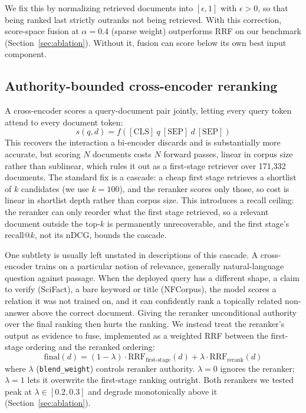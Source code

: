 \documentclass[11pt]{article}
\begin{document}
We fix this by normalizing retrieved documents into $[\epsilon, 1]$ with $\epsilon > 0$, so that being ranked last strictly outranks not being retrieved. With this correction, score-space fusion at $\alpha=0.4$ (sparse weight) outperforms RRF on our benchmark (Section~\ref{sec:ablation}). Without it, fusion can score below its own best input component.

\subsection{Authority-bounded cross-encoder reranking}
\label{sec:rerank-method}

A cross-encoder scores a query-document pair jointly, letting every query token attend to every document token:
\begin{equation}
s(q,d) = f([\text{CLS}]\ q\ [\text{SEP}]\ d\ [\text{SEP}])
\end{equation}
This recovers the interaction a bi-encoder discards and is substantially more accurate, but scoring $N$ documents costs $N$ forward passes, linear in corpus size rather than sublinear, which rules it out as a first-stage retriever over 171{,}332 documents. The standard fix is a cascade: a cheap first stage retrieves a shortlist of $k$ candidates (we use $k=100$), and the reranker scores only those, so cost is linear in shortlist depth rather than corpus size. This introduces a recall ceiling: the reranker can only reorder what the first stage retrieved, so a relevant document outside the top-$k$ is permanently unrecoverable, and the first stage's recall@$k$, not its nDCG, bounds the cascade.

One subtlety is usually left unstated in descriptions of this cascade. A cross-encoder trains on a particular notion of relevance, generally natural-language question against passage. When the deployed query has a different shape, a claim to verify (SciFact), a bare keyword or title (NFCorpus), the model scores a relation it was not trained on, and it can confidently rank a topically related non-answer above the correct document. Giving the reranker unconditional authority over the final ranking then hurts the ranking. We instead treat the reranker's output as evidence to fuse, implemented as a weighted RRF between the first-stage ordering and the reranked ordering:
\begin{equation}
\text{final}(d) = (1-\lambda)\cdot\text{RRF}_{\text{first-stage}}(d) + \lambda\cdot\text{RRF}_{\text{rerank}}(d)
\end{equation}
where $\lambda$ (\texttt{blend\_weight}) controls reranker authority. $\lambda=0$ ignores the reranker; $\lambda=1$ lets it overwrite the first-stage ranking outright. Both rerankers we tested peak at $\lambda \in [0.2, 0.3]$ and degrade monotonically above it (Section~\ref{sec:ablation}).
\end{document}
